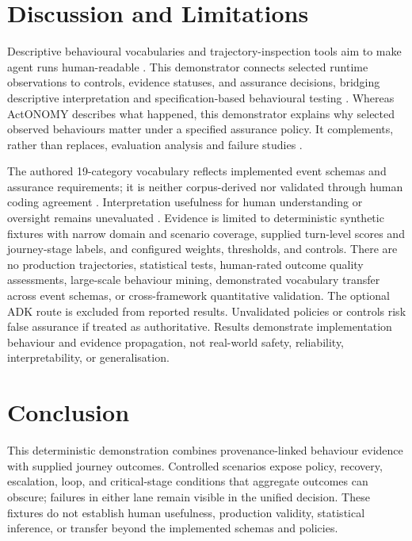 \documentclass{article}
\begin{document}
\section{Discussion and Limitations}
Descriptive behavioural vocabularies and trajectory-inspection tools aim to make agent runs human-readable \cite{gao2026interpretagent,desmond2025trajectoryexplorer}. 
This demonstrator connects selected runtime observations to controls, evidence statuses, and assurance decisions, bridging descriptive interpretation and specification-based behavioural testing
\cite{ribeiro2020checklist,leucker2009runtime}. Whereas Act\textperiodcentered ONOMY describes what happened, this demonstrator explains why selected observed behaviours matter under a specified assurance policy. It complements, rather than replaces, evaluation analysis and failure studies
\cite{kapoor2024agentsmatter,cemri2025multiagentfailures}.

The authored 19-category vocabulary reflects implemented event schemas
and assurance requirements; it is neither corpus-derived nor validated
through human coding agreement \cite{gao2026interpretagent}.
Interpretation usefulness for human understanding or oversight remains
unevaluated \cite{bowman2022scalableoversight}.
Evidence is limited to deterministic synthetic fixtures with narrow
domain and scenario coverage, supplied turn-level scores and journey-stage
labels, and configured weights, thresholds, and controls.
There are no production trajectories, statistical tests, human-rated
outcome quality assessments, large-scale behaviour mining, demonstrated
vocabulary transfer across event schemas, or cross-framework quantitative
validation. The optional ADK route is excluded from reported results.
Unvalidated policies or controls risk false assurance if treated as
authoritative. Results demonstrate implementation behaviour and evidence
propagation, not real-world safety, reliability, interpretability,
or generalisation.

\section{Conclusion}
This deterministic demonstration combines provenance-linked behaviour evidence with supplied journey outcomes. Controlled scenarios expose policy, recovery, escalation, loop, and critical-stage conditions that aggregate outcomes can obscure; failures in either lane remain visible in the unified decision. These fixtures do not establish human usefulness, production validity, statistical inference, or transfer beyond the implemented schemas and policies.
\end{document}
